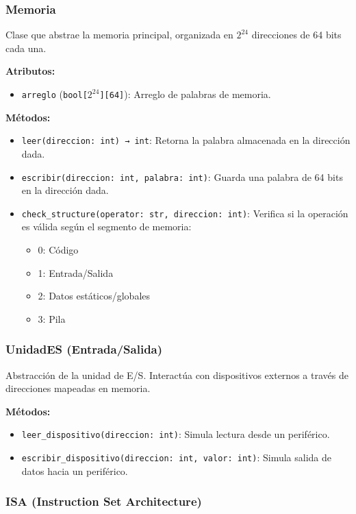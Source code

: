 \documentclass{article}
\begin{document}
\subsubsection*{Memoria}

Clase que abstrae la memoria principal, organizada en $2^{24}$ direcciones de 64 bits cada una.

\textbf{Atributos:}
\begin{itemize}
  \item \texttt{arreglo} (\texttt{bool[$2^{24}$][64]}): Arreglo de palabras de memoria.
\end{itemize}

\textbf{Métodos:}
\begin{itemize}
  \item \texttt{leer(direccion: int) → int}: Retorna la palabra almacenada en la dirección dada.
  \item \texttt{escribir(direccion: int, palabra: int)}: Guarda una palabra de 64 bits en
        la dirección dada.
  \item \texttt{check\_structure(operator: str, direccion: int)}: Verifica si la operación es válida
        según el segmento de memoria:
        \begin{itemize}
          \item 0: Código
          \item 1: Entrada/Salida
          \item 2: Datos estáticos/globales
          \item 3: Pila
        \end{itemize}
\end{itemize}

\subsubsection*{UnidadES (Entrada/Salida)}

Abstracción de la unidad de E/S. Interactúa con dispositivos externos a través de direcciones
mapeadas en memoria.

\textbf{Métodos:}
\begin{itemize}
  \item \texttt{leer\_dispositivo(direccion: int)}: Simula lectura desde un periférico.
  \item \texttt{escribir\_dispositivo(direccion: int, valor: int)}: Simula salida de datos hacia
        un periférico.
\end{itemize}

\subsubsection*{ISA (Instruction Set Architecture)}
\end{document}

